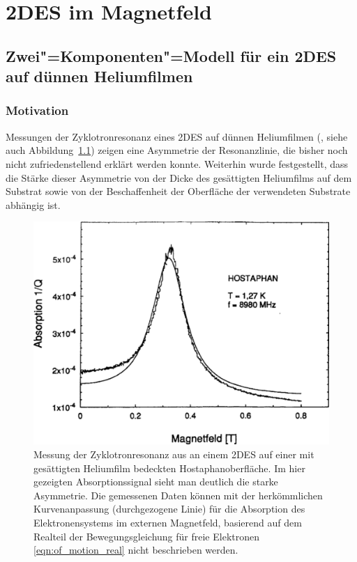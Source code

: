\chapter{2DES im Magnetfeld}
\section{Zwei"=Komponenten"=Modell für ein 2DES auf dünnen Heliumfilmen}
\label{sec:theo_zweikomponenten}

\subsection{Motivation}

Messungen der Zyklotronresonanz eines 2DES auf dünnen Heliumfilmen (\cite{guenzler, Mis98}, siehe auch Abbildung~\ref{fig:guenzler_cr_abs}) zeigen eine Asymmetrie der Resonanzlinie, die bisher noch nicht zufriedenstellend erklärt werden konnte. Weiterhin wurde festgestellt, dass die Stärke dieser Asymmetrie von der Dicke des gesättigten Heliumfilms auf dem Substrat sowie von der Beschaffenheit der Oberfläche der verwendeten Substrate abhängig ist.

\begin{figure}[h!tbp]
	\includegraphics[width=\smidwidth]{theo_zweikomponenten/guenzler_cr_abs}%
	\hfill%
	\begin{minipage}[b]{\textwidth-\smidwidth-\tabcolsep}
		\caption[Zyklotronresonanzmessung aus \cite{guenzler}]{Messung der Zyklotronresonanz aus \cite{guenzler} an einem 2DES auf einer mit gesättigten Heliumfilm bedeckten Hostaphanoberfläche. Im hier gezeigten Absorptionssignal sieht man deutlich die starke Asymmetrie. Die gemessenen Daten können mit der herkömmlichen Kurvenanpassung (durchgezogene Linie) für die Absorption des Elektronensystems im externen Magnetfeld, basierend auf dem Realteil der Bewegungsgleichung für freie Elektronen \eqref{eqn:of_motion_real} nicht beschrieben werden.}
	\label{fig:guenzler_cr_abs}
	\end{minipage}
\end{figure}


